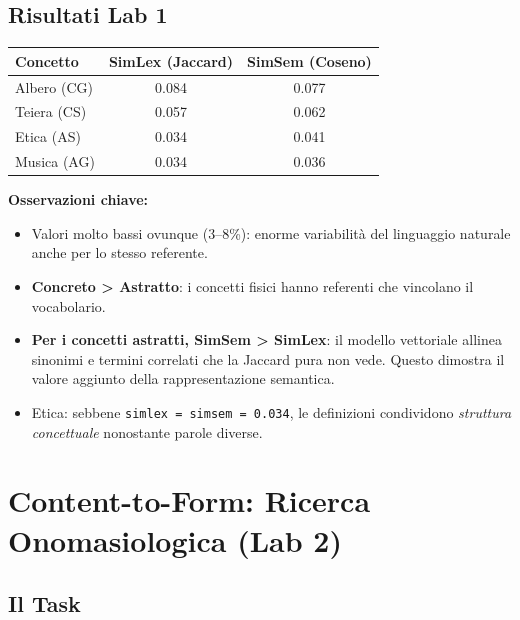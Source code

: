 \documentclass[12pt,a4paper]{article}
\begin{document}
\subsection{Risultati Lab 1}

\begin{resultbox}
\begin{center}
\begin{tabular}{lcc}
\toprule
\textbf{Concetto} & \textbf{SimLex (Jaccard)} & \textbf{SimSem (Coseno)} \\
\midrule
Albero (CG)  & 0.084 & 0.077 \\
Teiera (CS)  & 0.057 & 0.062 \\
Etica (AS)   & 0.034 & 0.041 \\
Musica (AG)  & 0.034 & 0.036 \\
\bottomrule
\end{tabular}
\end{center}
\end{resultbox}

\textbf{Osservazioni chiave:}
\begin{itemize}
  \item Valori molto bassi ovunque (3--8\%): enorme variabilit\`a del linguaggio naturale anche per lo stesso referente.
  \item \textbf{Concreto > Astratto}: i concetti fisici hanno referenti che vincolano il vocabolario.
  \item \textbf{Per i concetti astratti, SimSem > SimLex}: il modello vettoriale allinea sinonimi e termini correlati che la Jaccard pura non vede. Questo dimostra il valore aggiunto della rappresentazione semantica.
  \item Etica: sebbene \texttt{simlex = simsem = 0.034}, le definizioni condividono \emph{struttura concettuale} nonostante parole diverse.
\end{itemize}

\section{Content-to-Form: Ricerca Onomasiologica (Lab 2)}

\subsection{Il Task}\label{sec:lab2-impl}
\end{document}
